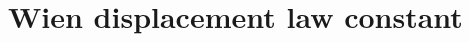 \hypertarget{group___wien_displacement}{}\section{Wien displacement law constant}
\label{group___wien_displacement}
